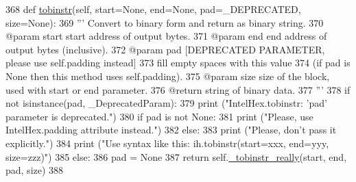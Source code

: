 \begin{DoxyCode}
368     \textcolor{keyword}{def }\hyperlink{classsoftware_1_1chipwhisperer_1_1capture_1_1utils_1_1IntelHex_1_1IntelHex_a63beaff3fa8ff85530da070327451542}{tobinstr}(self, start=None, end=None, pad=\_DEPRECATED, size=None):
369         \textcolor{stringliteral}{''' Convert to binary form and return as binary string.}
370 \textcolor{stringliteral}{        @param  start   start address of output bytes.}
371 \textcolor{stringliteral}{        @param  end     end address of output bytes (inclusive).}
372 \textcolor{stringliteral}{        @param  pad     [DEPRECATED PARAMETER, please use self.padding instead]}
373 \textcolor{stringliteral}{                        fill empty spaces with this value}
374 \textcolor{stringliteral}{                        (if pad is None then this method uses self.padding).}
375 \textcolor{stringliteral}{        @param  size    size of the block, used with start or end parameter.}
376 \textcolor{stringliteral}{        @return         string of binary data.}
377 \textcolor{stringliteral}{        '''}
378         \textcolor{keywordflow}{if} \textcolor{keywordflow}{not} isinstance(pad, \_DeprecatedParam):
379             \textcolor{keywordflow}{print} (\textcolor{stringliteral}{"IntelHex.tobinstr: 'pad' parameter is deprecated."})
380             \textcolor{keywordflow}{if} pad \textcolor{keywordflow}{is} \textcolor{keywordflow}{not} \textcolor{keywordtype}{None}:
381                 \textcolor{keywordflow}{print} (\textcolor{stringliteral}{"Please, use IntelHex.padding attribute instead."})
382             \textcolor{keywordflow}{else}:
383                 \textcolor{keywordflow}{print} (\textcolor{stringliteral}{"Please, don't pass it explicitly."})
384                 \textcolor{keywordflow}{print} (\textcolor{stringliteral}{"Use syntax like this: ih.tobinstr(start=xxx, end=yyy, size=zzz)"})
385         \textcolor{keywordflow}{else}:
386             pad = \textcolor{keywordtype}{None}
387         \textcolor{keywordflow}{return} self.\hyperlink{classsoftware_1_1chipwhisperer_1_1capture_1_1utils_1_1IntelHex_1_1IntelHex_a55a3436c4a45cc85f8c0d85add6f817a}{\_tobinstr\_really}(start, end, pad, size)
388 
\end{DoxyCode}
\hypertarget{classsoftware_1_1chipwhisperer_1_1capture_1_1utils_1_1IntelHex_1_1IntelHex_a7a570a4d3b81de987e2feb5fd1246ed3}{}

